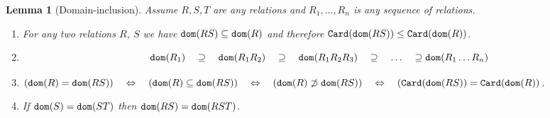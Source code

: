 \documentclass{lmcs}
\newtheorem{lemma}[theorem]{Lemma}
\begin{document}
\begin{lemma}[Domain-inclusion]
\label{lemma-domain-inclusion}
Assume $R, S, T$ are any relations and $R_1, \ldots, R_n$ is any sequence of relations.
\begin{enumerate}

\item
\label{lemma-domain-inclusion-01}
For any two relations $R$, $S$ we have ${\tt dom}(RS) \subseteq {\tt dom}(R)$
and therefore ${\tt Card}({\tt dom}(RS)) \le {\tt Card}({\tt dom}(R))$.

\item
\label{lemma-domain-inclusion-02}

$$
\dom(R_1)   \ \ \  \supseteq  \ \ \ 
\dom(R_1 R_2)    \ \ \  \supseteq  \ \ \ 
\dom(R_1 R_2 R_3)    \ \ \  \supseteq  \ \ \  
\ldots   \ \ \  \supseteq
\dom(R_1 \ldots R_n)
$$

\item
\label{lemma-domain-inclusion-03}
$
(\dom(R) = \dom(RS))  
\ \ \  \Leftrightarrow \ \ \ 
(\dom(R) \subseteq \dom(RS)) 
\ \ \  \Leftrightarrow \ \ \  
(\dom(R) \not \supset  \dom(RS))
\ \ \  \Leftrightarrow \ \ \ 
(\Card(\dom(RS)) = \Card(\dom(R))
$.

\item
\label{lemma-domain-inclusion-04}
If ${\tt dom}(S) = {\tt dom}(ST)$ then 
${\tt dom}(RS) = {\tt dom}(RST)$.

\end{enumerate}
\end{lemma}
\end{document}
